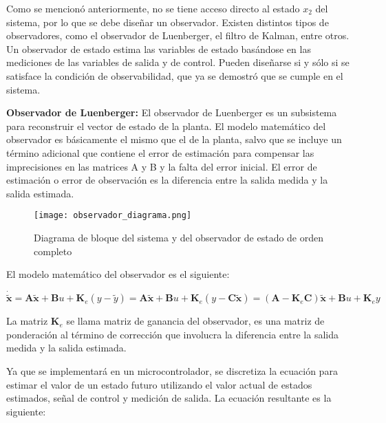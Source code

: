Como se mencionó anteriormente, no se tiene acceso directo al estado $x_2$ del sistema, por lo que se debe diseñar un observador.
Existen distintos tipos de observadores, como el observador de Luenberger, el filtro de Kalman, entre otros. Un observador de estado 
estima las variables de estado basándose en las mediciones de las variables de salida y de control. Pueden diseñarse si y sólo si
se satisface la condición de observabilidad, que ya se demostró que se cumple en el sistema.

\textbf{Observador de Luenberger:} El observador de Luenberger es un subsistema para reconstruir el vector de estado de la planta.
El modelo matemático del observador es básicamente el mismo que el de la planta, salvo que se incluye un término adicional
que contiene el error de estimación para compensar las imprecisiones en las matrices A y B y la falta del error inicial.
El error de estimación o error de observación es la diferencia entre la salida medida y la salida estimada.

\begin{figure}[H]
    \centering
    \texttt{[image: observador\_diagrama.png]}
    \vspace{-0.25cm}
    \caption{Diagrama de bloque del sistema y del observador de estado de orden completo}
    \label{fig:observador}
\end{figure}
\vspace{-0.5cm}

El modelo matemático del observador es el siguiente:

\vspace{-0.5cm}
\begin{equation}
    \mathbf{\dot{\tilde{x}}} = \textbf{A} \mathbf{\tilde{x}} + \textbf{B} u + \textbf{K}_e (y - \tilde{y})
    =
    \textbf{A} \mathbf{\tilde{x}} + \textbf{B} u + \textbf{K}_e (y - \textbf{C} \mathbf{\tilde{x}})
    =
    (\textbf{A} - \textbf{K}_e \textbf{C}) \mathbf{\tilde{x}} + \textbf{B} u + \textbf{K}_e y
\end{equation}
\vspace{-0.5cm}

La matriz $\textbf{K}_e$ se llama matriz de ganancia del observador, es una matriz de ponderación al término de corrección que involucra
la diferencia entre la salida medida y la salida estimada.

Ya que se implementará en un microcontrolador, se discretiza la ecuación para estimar el valor de un estado futuro utilizando
el valor actual de estados estimados, señal de control y medición de salida. La ecuación resultante es la siguiente:

